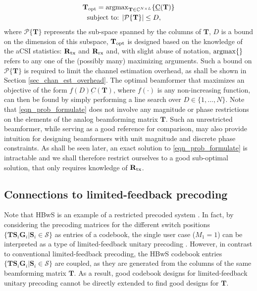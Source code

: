 \documentclass[journal,comsoc]{IEEEtran}
\begin{document}
\begin{eqnarray}
\mathbf{T}_{\rm opt} = {\rm argmax}_{\mathbf{T} \in \mathbb{C}^{N\times L}} \{ \underbar{C}(\mathbf{T}) \} \label{eqn_prob_formulate} \\
\text{subject to: } |\mathcal{P}\{\mathbf{T}\}| \leq D, \qquad \nonumber
\end{eqnarray}
where $\mathcal{P}\{\mathbf{T}\}$ represents the sub-space spanned by the columns of $\mathbf{T}$, $D$ is a bound on the dimension of this subspace, $\mathbf{T}_{\rm opt}$ is designed based on the knowledge of the aCSI statistics: $\mathbf{R}_{\rm tx}$ and $\mathbf{R}_{\rm rx}$ and, with slight abuse of notation, ${\rm argmax}\{\}$ refers to any one of the (possibly many) maximizing arguments. Such a bound on $\mathcal{P}\{\mathbf{T}\}$ is required to limit the channel estimation overhead, as shall be shown in Section \ref{sec_chan_est_overhead}. The optimal beamformer that maximizes an objective of the form $f(D)\underbar{C}(\mathbf{T})$, where $f(\cdot)$ is any non-increasing function, can then be found by simply performing a line search over $D \in \{1,...,N\}$. 
Note that \eqref{eqn_prob_formulate} does not involve any magnitude or phase restrictions on the elements of the analog beamforming matrix $\mathbf{T}$. Such an unrestricted beamformer, while serving as a good reference for comparison, may also provide intuition for designing beamformers with unit magnitude and discrete phase constraints. 
As shall be seen later, an exact solution to \eqref{eqn_prob_formulate} is intractable and we shall therefore restrict ourselves to a good sub-optimal solution, that only requires knowledge of $\mathbf{R}_{\rm tx}$.

\subsection{Connections to limited-feedback precoding} \label{sec_connections_LFP}
Note that HBwS is an example of a restricted precoded system \cite{Vishnu_jrnl1}. In fact, by considering the precoding matrices for the different switch positions $\{\mathbf{T} \mathbf{S}_i \mathbf{G}_i| \mathbf{S}_i \in \mathcal{S}\}$ as entries of a codebook, the single user 
case ($M_1=1$) can be interpreted as a type of limited-feedback unitary precoding \cite{Love_SMux, Review_love}. 
However, in contrast to conventional limited-feedback precoding, the HBwS codebook entries $\{\mathbf{T} \mathbf{S}_i \mathbf{G}_i| \mathbf{S}_i \in \mathcal{S}\}$ are coupled, as they are generated from the columns of the same beamforming matrix $\mathbf{T}$. As a result, good codebook designs for limited-feedback unitary precoding \cite{Love_SMux, Love_beamforming_correlated, Raghavan_rot_scale, Raghavan_RVQ} cannot be directly extended to find good designs for $\mathbf{T}$.
\end{document}
